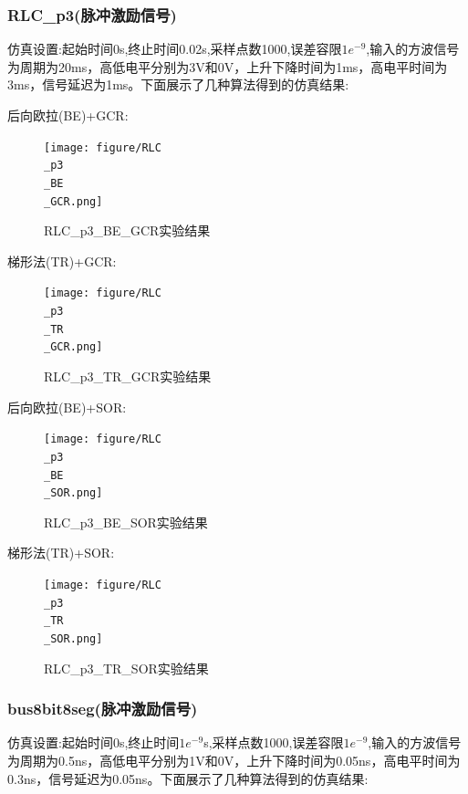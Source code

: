 \documentclass[12pt]{article}
\begin{document}
\begin{sloppypar}
\subsubsection{RLC\_p3(脉冲激励信号)}
\qquad 仿真设置:起始时间0s,终止时间0.02s,采样点数1000,误差容限$1e^{-9}$,输入的方波信号为周期为20ms，高低电平分别为3V和0V，上升下降时间为1ms，高电平时间为3ms，信号延迟为1ms。下面展示了几种算法得到的仿真结果:

后向欧拉(BE)+GCR:

\begin{figure}[H]
  \centering
  \texttt{[image: figure/RLC\\\_p3\\\_BE\\\_GCR.png]}
  \caption{RLC\_p3\_BE\_GCR实验结果}
\end{figure}

梯形法(TR)+GCR:

\begin{figure}[H]
  \centering
  \texttt{[image: figure/RLC\\\_p3\\\_TR\\\_GCR.png]}
  \caption{RLC\_p3\_TR\_GCR实验结果}
\end{figure}

后向欧拉(BE)+SOR:

\begin{figure}[H]
  \centering
  \texttt{[image: figure/RLC\\\_p3\\\_BE\\\_SOR.png]}
  \caption{RLC\_p3\_BE\_SOR实验结果}
\end{figure}

梯形法(TR)+SOR:

\begin{figure}[H]
  \centering
  \texttt{[image: figure/RLC\\\_p3\\\_TR\\\_SOR.png]}
  \caption{RLC\_p3\_TR\_SOR实验结果}
\end{figure}

\subsubsection{bus8bit8seg(脉冲激励信号)}
\qquad 仿真设置:起始时间0s,终止时间$1e^{-9}$s,采样点数1000,误差容限$1e^{-9}$,输入的方波信号为周期为0.5ns，高低电平分别为1V和0V，上升下降时间为0.05ns，高电平时间为0.3ns，信号延迟为0.05ns。下面展示了几种算法得到的仿真结果:


\end{sloppypar}
\end{document}

